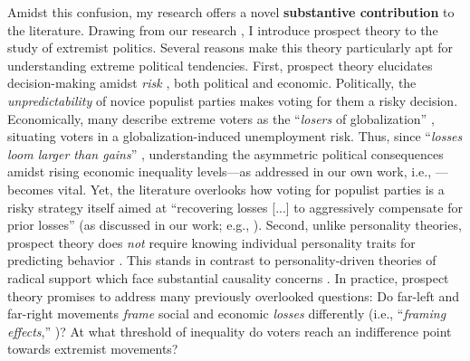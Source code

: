 \documentclass[letterpaper]{article}
\begin{document}
\vspace{2mm}Amidst this confusion, my research offers a novel {\bf substantive contribution} to the literature. Drawing from our research \parencite{Bahamonde2022b}, I introduce prospect theory \parencite{Kahneman1979} to the study of extremist politics. Several reasons make this theory particularly apt for understanding extreme political tendencies. First, prospect theory elucidates decision-making amidst \emph{risk} \parencite{McDermott1998,Levy1992a}, both political and economic. Politically, the \emph{unpredictability} of novice populist parties \parencite{Ivarsflaten2008} makes voting for them a risky decision. Economically, many describe extreme voters as the ``\emph{losers} of globalization'' \parencite{Im2019,Milner2021b}, situating voters in a globalization-induced unemployment risk.  Thus, since ``\emph{losses loom larger than gains}'' \parencite{Kahneman1979}, understanding the asymmetric political consequences amidst rising economic inequality levels---as addressed in our own work, i.e., \parencite{Bahamonde2021}---becomes vital. Yet, the literature overlooks how voting for populist parties is a risky strategy itself aimed at ``recovering losses [...] to aggressively compensate for prior losses'' (as discussed in our work; e.g., \cite[p. 2]{Bahamonde2022b}). Second, unlike personality theories, prospect theory does \emph{not} require knowing individual personality traits for predicting behavior \parencite{McDermott2004,Vis2011}. This stands in contrast to personality-driven theories of radical support \parencite{Cohen2016} which face substantial causality concerns \parencite{Mudde2007b}. In practice, prospect theory promises to address many previously overlooked questions: Do far-left and far-right movements \emph{frame} social and economic \emph{losses} differently (i.e., ``\emph{framing effects},'' \cite{Kahneman1979})? At what threshold of inequality do voters reach an indifference point towards extremist movements?
\end{document}
